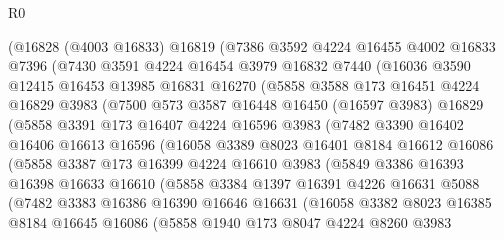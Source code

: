 \begin{lexlean}{R0}
\begin{coremodule}
    (@16828
      (@4003 @16833)
      @16819
      (@7386
        @3592
        @4224
        @16455
        @4002
        @16833
        @7396
        (@7430
          @3591
          @4224
          @16454
          @3979
          @16832
          @7440
          (@16036
            @3590
            @12415
            @16453
            @13985
            @16831
            @16270
            (@5858
              @3588
              @173
              @16451
              @4224
              @16829
              @3983
              (@7500
                @573
                @3587
                @16448
                @16450
                (@16597 @3983)
                @16829
                (@5858
                  @3391
                  @173
                  @16407
                  @4224
                  @16596
                  @3983
                  (@7482
                    @3390
                    @16402
                    @16406
                    @16613
                    @16596
                    (@16058
                      @3389
                      @8023
                      @16401
                      @8184
                      @16612
                      @16086
                      (@5858
                        @3387
                        @173
                        @16399
                        @4224
                        @16610
                        @3983
                        (@5849
                          @3386
                          @16393
                          @16398
                          @16633
                          @16610
                          (@5858
                            @3384
                            @1397
                            @16391
                            @4226
                            @16631
                            @5088
                            (@7482
                              @3383
                              @16386
                              @16390
                              @16646
                              @16631
                              (@16058
                                @3382
                                @8023
                                @16385
                                @8184
                                @16645
                                @16086
                                (@5858
                                  @1940
                                  @173
                                  @8047
                                  @4224
                                  @8260
                                  @3983

\end{coremodule}
\end{lexlean}

